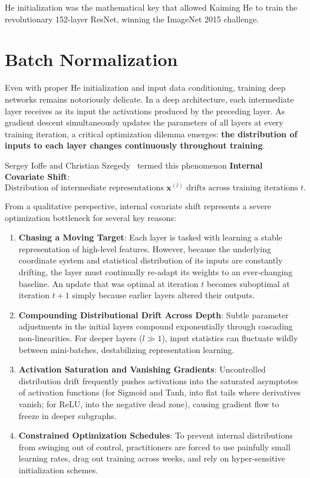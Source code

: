 He initialization was the mathematical key that allowed Kaiming He to train the revolutionary 152-layer ResNet, winning the ImageNet 2015 challenge.

\section{Batch Normalization}
\label{sec:batch_normalization_theory}

Even with proper He initialization and input data conditioning, training deep networks remains notoriously delicate. In a deep architecture, each intermediate layer receives as its input the activations produced by the preceding layer. As gradient descent simultaneously updates the parameters of all layers at every training iteration, a critical optimization dilemma emerges: \textbf{the distribution of inputs to each layer changes continuously throughout training}.

Sergey Ioffe and Christian Szegedy~\cite{ioffe2015batch} termed this phenomenon \textbf{Internal Covariate Shift}:
\begin{equation}
\text{Distribution of intermediate representations } \mathbf{x}^{(l)} \text{ drifts across training iterations } t.
\end{equation}

From a qualitative perspective, internal covariate shift represents a severe optimization bottleneck for several key reasons:
\begin{enumerate}[leftmargin=*]
  \item \textbf{Chasing a Moving Target}: Each layer is tasked with learning a stable representation of high-level features. However, because the underlying coordinate system and statistical distribution of its inputs are constantly drifting, the layer must continually re-adapt its weights to an ever-changing baseline. An update that was optimal at iteration $t$ becomes suboptimal at iteration $t+1$ simply because earlier layers altered their outputs.
  \item \textbf{Compounding Distributional Drift Across Depth}: Subtle parameter adjustments in the initial layers compound exponentially through cascading non-linearities. For deeper layers ($l \gg 1$), input statistics can fluctuate wildly between mini-batches, destabilizing representation learning.
  \item \textbf{Activation Saturation and Vanishing Gradients}: Uncontrolled distribution drift frequently pushes activations into the saturated asymptotes of activation functions (for Sigmoid and Tanh, into flat tails where derivatives vanish; for ReLU, into the negative dead zone), causing gradient flow to freeze in deeper subgraphs.
  \item \textbf{Constrained Optimization Schedules}: To prevent internal distributions from swinging out of control, practitioners are forced to use painfully small learning rates, drag out training across weeks, and rely on hyper-sensitive initialization schemes.
\end{enumerate}

